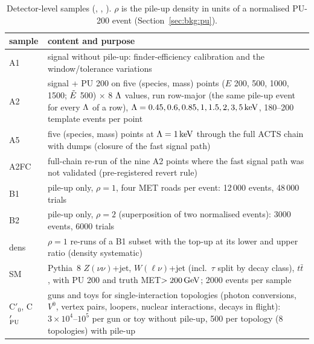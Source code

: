 \begin{table}[htbp]
\centering
\small
\caption{Detector-level samples (, , ).
$\rho$ is the pile-up density in units of a normalised PU-200 event (Section~\ref{sec:bkg:pu}).}
\label{tab:samples}
\begin{tabularx}{\linewidth}{lX}
\toprule
sample & content and purpose\\
\midrule
A1 & signal without pile-up: finder-efficiency calibration and the window/tolerance variations\\
A2 & signal + PU 200 on five (species, mass) points ($E$ 200, 500, 1000, 1500; $\tilde{E}$ 500) $\times$ 8 $\Lambda$ values, run row-major
     (the same pile-up event for every $\Lambda$ of a row), $\Lambda=0.45,0.6,0.85,1,1.5,2,3,5\,\mathrm{keV}$, 180--200 template events
     per point\\
A5 & five (species, mass) points at $\Lambda=1\,\mathrm{keV}$ through the full ACTS chain with dumps (closure of the fast signal path)\\
A2FC & full-chain re-run of the nine A2 points where the fast signal path was not validated (pre-registered revert rule)\\
B1 & pile-up only, $\rho=1$, four MET roads per event: 12\,000 events, 48\,000 trials\\
B2 & pile-up only, $\rho=2$ (superposition of two normalised events): 3000 events, 6000 trials\\
dens & $\rho=1$ re-runs of a B1 subset with the top-up at its lower and upper ratio (density systematic)\\
SM & Pythia~8 $Z(\nu\nu)$+jet, $W(\ell\nu)$+jet (incl.\ $\tau$ split by decay class), $t\bar t$, with PU 200 and truth MET$>200\,\mathrm{GeV}$;
     2000 events per sample\\
C$'_0$, C$'_{\rm PU}$ & guns and toys for single-interaction topologies (photon conversions, $V^0$, vertex pairs, loopers,
     nuclear interactions, decays in flight): $3\times10^4$--$10^5$ per gun or toy without pile-up, 500 per topology (8 topologies) with
     pile-up\\
\bottomrule
\end{tabularx}
\end{table}
